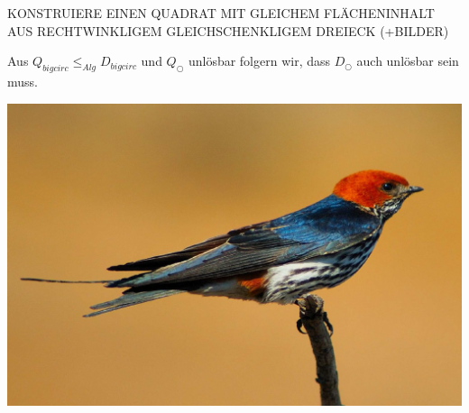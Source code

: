 \documentclass[
	12pt, %
	german, %
]{fphw}
\begin{document}
KONSTRUIERE EINEN QUADRAT MIT GLEICHEM FLÄCHENINHALT AUS RECHTWINKLIGEM GLEICHSCHENKLIGEM DREIECK (+BILDER)

Aus \(Q_{bigcirc} \leq_{Alg} D_{bigcirc}\) und \(Q_{\bigcirc}\) unlösbar folgern wir, dass \(D_{\bigcirc}\) auch unlösbar sein muss.

\begin{center}
	\includegraphics[width=0.5\columnwidth]{swallow.jpg} %
\end{center}
\end{document}
